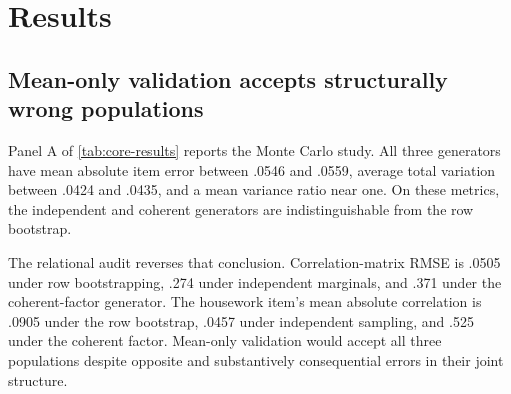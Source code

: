 \documentclass[10pt,twocolumn]{article}
\begin{document}
\section{Results}

\subsection{Mean-only validation accepts structurally wrong populations}

Panel A of \cref{tab:core-results} reports the Monte Carlo study. All three generators have mean
absolute item error between .0546 and .0559, average total variation between .0424 and .0435, and a
mean variance ratio near one. On these metrics, the independent and coherent generators are
indistinguishable from the row bootstrap.

The relational audit reverses that conclusion. Correlation-matrix RMSE is .0505 under row
bootstrapping, .274 under independent marginals, and .371 under the coherent-factor generator. The
housework item's mean absolute correlation is .0905 under the row bootstrap, .0457 under independent
sampling, and .525 under the coherent factor. Mean-only validation would accept all three
populations despite opposite and substantively consequential errors in their joint structure.
\end{document}
